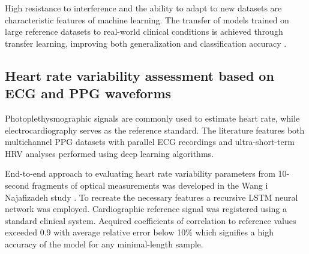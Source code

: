\documentclass[journal]{IEEEtran}
\begin{document}
High resistance to interference and the ability to adapt to new datasets are characteristic features of machine learning. The transfer of models trained on large reference datasets to real-world clinical conditions is achieved through transfer learning, improving both generalization and classification accuracy \cite{16}.

\subsection{Heart rate variability assessment based on ECG and PPG waveforms}
Photoplethysmographic signals are commonly used to estimate heart rate, while electrocardiography serves as the reference standard. The literature features both multichannel PPG datasets with parallel ECG recordings and ultra-short-term HRV analyses performed using deep learning algorithms.

End-to-end approach to evaluating heart rate variability parameters from 10-second fragments of optical measurements was developed in the Wang i Najafizadeh study \cite{17}. To recreate the necessary features a recursive LSTM neural network was employed. Cardiographic reference signal was registered using a standard clinical system. Acquired coefficients of correlation to reference values exceeded 0.9 with average relative error below 10\% which signifies a high accuracy of the model for any minimal-length sample.
\end{document}
